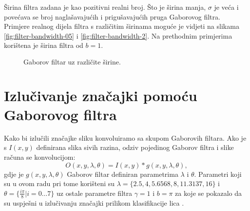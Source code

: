 \documentclass[12pt,a4paper]{ReportAA}
\begin{document}
Širina filtra zadana je kao pozitivni realni broj. Što je širina manja,
$\sigma$ je veća i povećava se broj naglašavajućih i prigušavajućih pruga
Gaborovog filtra.~ Primjere realnog dijela filtra s
različitim širinama moguće je vidjeti na slikama \ref{fig:filter-bandwidth-05}
i \ref{fig:filter-bandwidth-2}. Na prethodnim primjerima korištena je širina
filtra od $b = 1$.

\begin{figure}[h!tb]
\centering
{}
\hspace{50pt}
\caption{Gaborov filtar uz različite širine.}
\label{fig:filter-bandwidths}
\end{figure}

\chapter{Izlučivanje značajki pomoću Gaborovog filtra}

Kako bi izlučili značajke sliku konvoluiramo sa skupom Gaborovih filtara. Ako
je s $I(x, y)$ definirana slika sivih razina, odziv pojedinog Gaborov filtra i
slike računa se konvolucijom:
\begin{equation}
O(x,y,\lambda, \theta) = I(x,y) * g(x,y,\lambda, \theta),
\label{konvolucija-filter-slika}
\end{equation}
gdje je $g(x,y,\lambda, \theta)$ Gaborov filtar definiran parametrima $\lambda$
i $\theta$. Parametri koji su u ovom radu pri tome korišteni su $\lambda =
\{2.5, 4, 5.6568, 8, 11.3137, 16\}$ i $\theta = \{ \frac{i \pi}{8} | i =
0 \ldots 7\}$ uz ostale parametre filtra $\gamma = 1$ i $b = \pi$ za koje se
pokazalo da su uspješni u izlučivanju značajki prilikom klasifikacije lica
\citep{shen2007gabor}.
\end{document}
